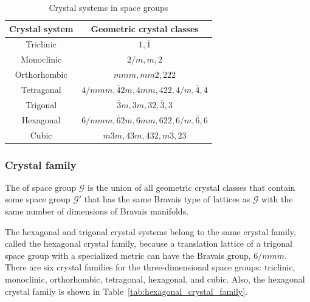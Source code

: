 \begin{table}[htb]
  \centering
  \caption{Crystal systems in space groups}
  \label{tab:crystal_system}
  \begin{tabular}{cc}
    \hline\hline
    Crystal system & Geometric crystal classes                                \\ \hline
    Triclinic      & $1, \overline{1}$                                        \\
    Monoclinic     & $2/m, m, 2$                                              \\
    Orthorhombic   & $mmm, mm2, 222$                                          \\
    Tetragonal     & $4/mmm, \overline{4}2m, 4mm, 422, 4/m, \overline{4}, 4$  \\
    Trigonal       & $\overline{3}m, 3m, 32, \overline{3}, 3$                 \\
    Hexagonal      & $6/mmm, \overline{6}2m, 6mm, 622, 6/m, \overline{6}, 6$  \\
    Cubic          & $m\overline{3}m, \overline{4}3m, 432, m\overline{3}, 23$ \\
    \hline\hline
  \end{tabular}
\end{table}

\subsubsection{\label{sec:crystal-family}Crystal family}

\begin{screen}
  \begin{defn}
    The  of space group $\mathcal{G}$ is the union of all geometric crystal classes that contain some space group $\mathcal{G}'$ that has the same Bravais type of lattices as $\mathcal{G}$ with the same number of dimensions of Bravais manifolds.
  \end{defn}
\end{screen}

The hexagonal and trigonal crystal systems belong to the same crystal family, called the hexagonal crystal family, because a translation lattice of a trigonal space group with a specialized metric can have the Bravais group, $6/mmm$.
There are six crystal families for the three-dimensional space groups: triclinic, monoclinic, orthorhombic, tetragonal, hexagonal, and cubic.
Also, the hexagonal crystal family is shown in Table~\ref{tab:hexagonal_crystal_family}.

